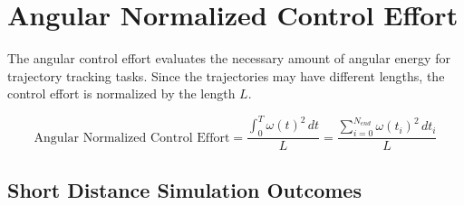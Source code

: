 \section{Angular Normalized Control Effort}
The angular control effort evaluates the necessary amount of angular energy 
for trajectory tracking tasks.
Since the trajectories may have different lengths, the control effort is 
normalized by the length $L$.

\begin{equation} 
     \text{Angular Normalized Control Effort} = \frac{\int_{0}^{T} \omega(t)^2 \, dt}{L}
     = \frac{\sum_{i=0}^{N_{end}} \omega(t_i)^2 \, d t_{i}}{L}
\end{equation}

\subsection{Short Distance Simulation Outcomes}
\vspace*{-0.5em}
